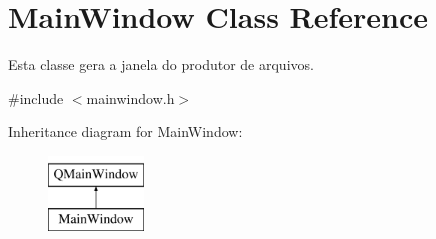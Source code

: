 \hypertarget{class_main_window}{}\section{Main\+Window Class Reference}
\label{class_main_window}


Esta classe gera a janela do produtor de arquivos.  




{\ttfamily \#include $<$mainwindow.\+h$>$}

Inheritance diagram for Main\+Window\+:\begin{figure}[H]
\begin{center}
\leavevmode
\includegraphics[height=2.000000cm]{class_main_window}
\end{center}
\end{figure}
